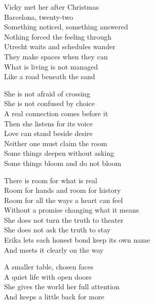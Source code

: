 \begin{lyrics}
Vicky met her after Christmas\\
Barcelona, twenty-two\\
Something noticed, something answered\\
Nothing forced the feeling through\\
Utrecht waits and schedules wander\\
They make spaces when they can\\
What is living is not managed\\
Like a road beneath the sand

She is not afraid of crossing\\
She is not confused by choice\\
A real connection comes before it\\
Then she listens for its voice\\
Love can stand beside desire\\
Neither one must claim the room\\
Some things deepen without asking\\
Some things bloom and do not bloom

There is room for what is real\\
Room for hands and room for history\\
Room for all the ways a heart can feel\\
Without a promise changing what it means\\
She does not turn the truth to theater\\
She does not ask the truth to stay\\
Erika lets each honest bond keep its own name\\
And meets it clearly on the way

A smaller table, chosen faces\\
A quiet life with open doors\\
She gives the world her full attention\\
And keeps a little back for more
\end{lyrics}

